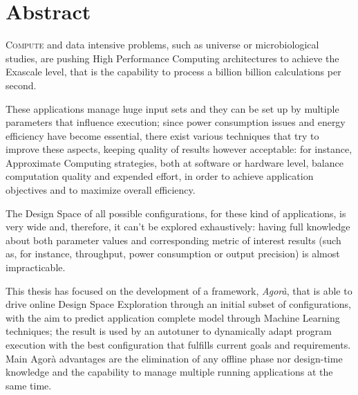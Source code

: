 \chapter*{Abstract}

\lettrine{C}{ompute} and data intensive problems, such as universe or microbiological studies, are pushing High Performance Computing architectures to achieve the Exascale level, that is the capability to process a billion billion calculations per second.

These applications manage huge input sets and they can be set up by multiple parameters that influence execution; since power consumption issues and energy efficiency have become essential, there exist various techniques that try to improve these aspects, keeping quality of results however acceptable: for instance, Approximate Computing strategies, both at software or hardware level, balance computation quality and expended effort, in order to achieve application objectives and to maximize overall efficiency.

The Design Space of all possible configurations, for these kind of applications, is very wide and, therefore, it can't be explored exhaustively: having full knowledge about both parameter values and corresponding metric of interest results (such as, for instance, throughput, power consumption or output precision) is almost impracticable.

This thesis has focused on the development of a framework, \textit{Agorà}, that is able to drive online Design Space Exploration through an initial subset of configurations, with the aim to predict application complete model through Machine Learning techniques; the result is used by an autotuner to dynamically adapt program execution with the best configuration that fulfills current goals and requirements. Main Agorà advantages are the elimination of any offline phase nor design-time knowledge and the capability to manage multiple running applications at the same time.
